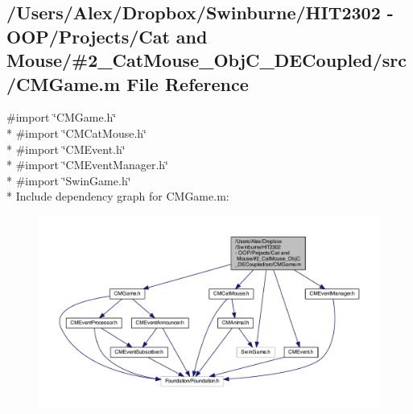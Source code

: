 \subsection{/\-Users/\-Alex/\-Dropbox/\-Swinburne/\-H\-I\-T2302 -\/ O\-O\-P/\-Projects/\-Cat and Mouse/\#2\-\_\-\-Cat\-Mouse\-\_\-\-Obj\-C\-\_\-\-D\-E\-Coupled/src/\-C\-M\-Game.m File Reference}
\label{_c_m_game_8m}
{\ttfamily \#import \char`\"{}C\-M\-Game.\-h\char`\"{}}\\*
{\ttfamily \#import \char`\"{}C\-M\-Cat\-Mouse.\-h\char`\"{}}\\*
{\ttfamily \#import \char`\"{}C\-M\-Event.\-h\char`\"{}}\\*
{\ttfamily \#import \char`\"{}C\-M\-Event\-Manager.\-h\char`\"{}}\\*
{\ttfamily \#import \char`\"{}Swin\-Game.\-h\char`\"{}}\\*
Include dependency graph for C\-M\-Game.\-m\-:
\nopagebreak
\begin{figure}[H]
\begin{center}
\leavevmode
\includegraphics[width=350pt]{_c_m_game_8m__incl}
\end{center}
\end{figure}
